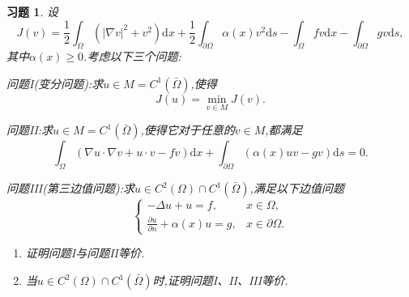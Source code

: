 \documentclass[a4paper,oneside,12pt]{ctexart}
\theoremstyle{plain}
\newtheorem{exercise}{习题}
\theoremstyle{nonumberplain}
\theoremstyle{nonumberplain}
\newcommand{\dif}{\mathrm{d}}
\newcommand{\ptl}{\partial}
\newcommand{\abs}[1]{\left\vert#1\right\vert}
\begin{document}
    \begin{exercise}
        \label{ex:1.3}
        设
        \begin{equation*}
            J(v)=\frac{1}{2}\int_\Omega(\abs{\nabla v}^2+v^2)\dif x+\frac{1}{2}\int_{\ptl\Omega}\alpha(x)v^2\dif s-\int_\Omega fv\dif x-\int_{\ptl\Omega}gv\dif s,
        \end{equation*}
        其中$\alpha(x)\geqslant 0$.考虑以下三个问题:
        
        问题I(变分问题):求$u\in M=C^1(\bar{\Omega})$,使得
        \begin{equation*}
            J(u)=\min_{v\in M}J(v).
        \end{equation*}

        问题II:求$u\in M=C^1(\bar{\Omega})$,使得它对于任意的$v\in M$,都满足
        \begin{equation*}
            \int_\Omega(\nabla u\cdot\nabla v+u\cdot v-fv)\dif x+\int_{\ptl\Omega}(\alpha(x)uv-gv)\dif s=0.
        \end{equation*}
        
        问题III(第三边值问题):求$u\in C^2(\Omega)\cap C^1(\bar{\Omega})$,满足以下边值问题
        \begin{equation*}
            \begin{cases}
                -\Delta u+u=f,&x\in\Omega,\\
                \frac{\ptl u}{\ptl n}+\alpha(x)u=g,&x\in\ptl\Omega.
            \end{cases}
        \end{equation*}

        \begin{enumerate}
            \item 证明问题I与问题II等价.
            \item 当$u\in C^2(\Omega)\cap C^1(\bar{\Omega})$时,证明问题I、II、III等价.
        \end{enumerate}
    \end{exercise}
\end{document}
